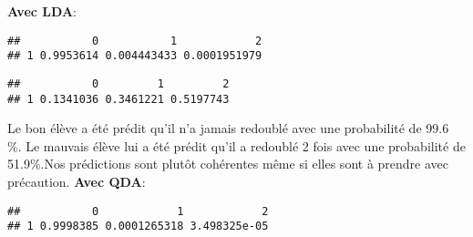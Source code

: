 \documentclass[
]{article}
\newenvironment{Shaded}{\begin{snugshade}}{\end{snugshade}}
\newcommand{\FunctionTok}[1]{\textcolor[rgb]{0.00,0.00,0.00}{#1}}
\newcommand{\NormalTok}[1]{#1}
\newcommand{\OtherTok}[1]{\textcolor[rgb]{0.56,0.35,0.01}{#1}}
\newcommand{\SpecialCharTok}[1]{\textcolor[rgb]{0.00,0.00,0.00}{#1}}
\begin{document}
\textbf{Avec LDA}:

\begin{Shaded}
\end{Shaded}

\begin{verbatim}
##           0           1            2
## 1 0.9953614 0.004443433 0.0001951979
\end{verbatim}

\begin{Shaded}
\end{Shaded}

\begin{verbatim}
##           0         1         2
## 1 0.1341036 0.3461221 0.5197743
\end{verbatim}

Le bon élève a été prédit qu'il n'a jamais redoublé avec une probabilité
de 99.6 \%. Le mauvais élève lui a été prédit qu'il a redoublé 2 fois
avec une probabilité de 51.9\%.Nos prédictions sont plutôt cohérentes
même si elles sont à prendre avec précaution. \textbf{Avec QDA}:

\begin{Shaded}
\end{Shaded}

\begin{verbatim}
##           0            1            2
## 1 0.9998385 0.0001265318 3.498325e-05
\end{verbatim}

\begin{Shaded}
\end{Shaded}
\end{document}
